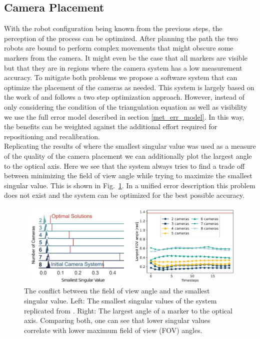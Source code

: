 \documentclass[5p,times,procedia]{elsarticle}
\begin{document}
\subsection{Camera Placement}
With the robot configuration being known from the previous steps, the perception of the process can be optimized.
After planning the path the two robots are bound to perform complex movements that might obscure some markers from the camera.
It might even be the case that all markers are visible but that they are in regions where the camera system has a low measurement accuracy.
To mitigate both problems we propose a software system that can optimize the placement of the cameras as needed.
This system is largely based on the work of \cite{camera_placement} and follows a two step optimization approach.
However, instead of only considering the condition of the triangulation equation as well as visibility we use the full error model described in section \ref{met_err_model}.
In this way, the benefits can be weighted against the additional effort required  for repositioning and recalibration. \\
%
Replicating the results of \cite{camera_placement} where the smallest singular value was used as a measure of the quality of the camera placement we can additionally plot the largest angle to the optical axis.
Here we see that the system always tries to find a trade off between minimizing the field of view angle while trying to maximize the smallest singular value.
This is shown in Fig.~\ref{fig:fov_sv_conflict}.
In a unified error description this problem does not exist and the system can be optimized for the best possible accuracy.
\begin{figure}[hbt]
	\centering
	\includegraphics[width=0.95\columnwidth]{graphics/fov_sv_conflict.png}
	\caption{The conflict between the field of view angle and the smallest singular value. Left: The smallest singular values of the system replicated from \cite{camera_placement}. Right: The largest angle of a marker to the optical axis.
		Comparing both, one can see that lower singular values correlate with lower maximum field of view (FOV) angles.}
	\label{fig:fov_sv_conflict}
\end{figure}
\end{document}

